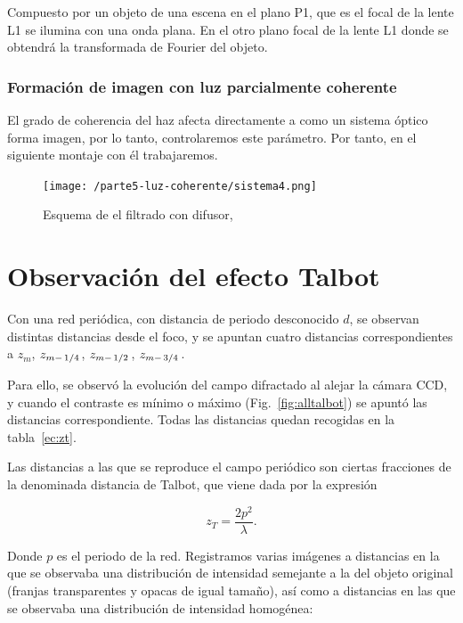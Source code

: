 \documentclass{./packages/optica-article}
\begin{document}
Compuesto por un objeto de una escena en el plano P1, que es el focal de la lente L1 se ilumina con una onda plana. 
En el otro plano focal de la lente L1 donde se obtendrá la transformada de Fourier del objeto.

\subsubsection{Formación de imagen con luz parcialmente coherente}

El grado de coherencia del haz afecta directamente a como un sistema óptico forma imagen, por lo tanto, controlaremos este parámetro. 
Por tanto, en el siguiente montaje con él trabajaremos.

\begin{figure}[h]
	\centering
	\texttt{[image: /parte5-luz-coherente/sistema4.png]}
	\caption{Esquema de el filtrado con difusor, }
	\label{fig:coherenciaespacial}
\end{figure}






\section{Observación del efecto Talbot}
Con una red periódica, con distancia de periodo desconocido $d$, se observan  distintas distancias desde el foco, y se apuntan cuatro distancias correspondientes a $z_m$, $z_{m-\flatfrac 1 4}$, $z_{m-\flatfrac 1 2}$, $z_{m-\flatfrac 3 4}$. 

Para ello, se observó la evolución del campo difractado al alejar la cámara CCD, y cuando el contraste es mínimo o máximo (Fig.~\ref{fig:alltalbot})  se apuntó las distancias correspondiente. Todas las distancias quedan recogidas en la tabla~\ref{ec:zt}.

Las distancias a las que se reproduce el campo periódico son ciertas fracciones de la denominada distancia de Talbot, 
que viene dada por la expresión

\begin{equation}
	z_T = \frac{2p^2}{\lambda}.
	\label{ec:zt}
\end{equation}


Donde $p$ es el periodo de la red. 
Registramos varias imágenes a distancias en la que se observaba una distribución de intensidad semejante a la del objeto original (franjas transparentes y opacas de igual tamaño), 
así como a distancias en las que se observaba una distribución de intensidad homogénea:
\end{document}
